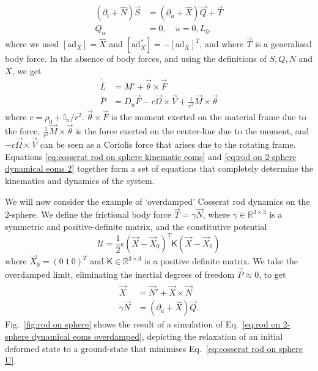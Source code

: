\begin{subequations} \label{eq:rod on 2-sphere dynamical eoms}
\begin{align}
(\partial_t + \hat{N}) \vec{S} & = (\partial_u + \hat{X}) \vec{Q} + \vec{T} \\
Q_\alpha & = 0, \quad u = 0, L_0.
\end{align}
\end{subequations}
where we used $[\text{ad}_X] = \hat{X}$ and $[\text{ad}^*_X] = -[\text{ad}_X]^T$, and where $\vec{T}$ is a generalised body force. In the absence of body forces, and using the definitions of $S, Q, N$ and $X$, we get
\begin{subequations} 
\begin{align} \label{eq:rod on 2-sphere dynamical eoms 2}
\dot{\bar{L}} & = M' + \vec{\theta} \times \vec{F} \\
\dot{\bar{P}} & = D_u \vec{F} - c \vec{\Omega} \times \vec{V} + \frac{1}{r^2} \vec{M} \times \vec{\theta}
\end{align}
\end{subequations}
where $c = \rho_0 + \mathbb{I}_n/r^2$. $\vec{\theta} \times \vec{F}$ is the moment exerted on the material frame due to the force, $\frac{1}{r^2} \vec{M} \times \vec{\theta}$ is the force exerted on the center-line due to the moment, and $- c \vec{\Omega} \times \vec{V}$ can be seen as a Coriolis force that arises due to the rotating frame. Equations \ref{eq:cosserat rod on sphere kinematic eoms} and \ref{eq:rod on 2-sphere dynamical eoms 2} together form a set of equations that completely determine the kinematics and dynamics of the system.

We will now consider the example of `overdamped' Cosserat rod dynamics on the $2$-sphere. We define the frictional body force $\vec{T} = \gamma \vec{N}$, where $\gamma \in \mathbb{R}^{3\times 3}$ is a symmetric and positive-definite matrix, and the constitutive potential
\begin{equation} \label{eq:cosserat rod on sphere U}
\mathcal{U} = \frac{1}{2} \epsilon (\vec{X} - \vec{X}_0)^T \mathsf{K} (\vec{X} - \vec{X}_0)
\end{equation}
where $\vec{X}_0 = (0\ 1\ 0)^T$ and $\mathsf{K} \in \mathbb{R}^{3 \times 3}$ is a positive definite matrix. We take the overdamped limit, eliminating the inertial degrees of freedom $\vec{P} \approx 0$, to get
\begin{subequations} \label{eq:rod on 2-sphere dynamical eoms overdamped}
\begin{align}
\dot{\vec{X}} & = \vec{N}' + \vec{X} \times \vec{N} \\
\gamma \vec{N} & = (\partial_u + \hat{X}) \vec{Q}.
\end{align}
\end{subequations}
Fig.~\ref{fig:rod on sphere} shows the result of a simulation of Eq.~\ref{eq:rod on 2-sphere dynamical eoms overdamped}, depicting the relaxation of an initial deformed state to a ground-state that minimises Eq.~\ref{eq:cosserat rod on sphere U}.


